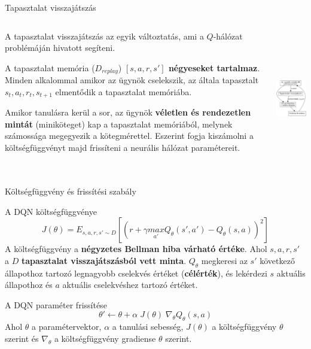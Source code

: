 \documentclass[english, aspectratio=169]{beamer}
\begin{document}
\begin{frame}{Tapasztalat visszajátszás}
\begin{columns}
\begin{column}{.65\textwidth}
A tapasztalat visszajátszás az egyik változtatás, ami a $Q$-hálózat problémáján hivatott segíteni.\par\smallskip
A tapasztalat memória ($D_{replay}$) \textbf{$[s,a,r,s']$ négyeseket tartalmaz}. Minden alkalommal amikor az ügynök cselekszik, az általa tapasztalt $s_t, a_t, r_t, s_{t+1}$ elmentődik a tapasztalat memóriába.\par\smallskip
Amikor tanulásra kerül a sor, az ügynök \textbf{véletlen és rendezetlen mintát} (miniköteget) kap a tapasztalat memóriából, melynek számossága megegyezik a kötegmérettel. Eszerint fogja kiszámolni a költségfüggvényt majd frissíteni a neurális hálózat paramétereit.
\end{column}
\begin{column}{.35\textwidth}
\begin{center}
\includegraphics[height=6cm, keepaspectratio]{graphs/ql_4.png}
\end{center}
\end{column}
\end{columns}
\end{frame}

\begin{frame}{Költségfüggvény és frissítési szabály}
\begin{block}{A DQN költségfüggvénye}
\[
J(\theta) = E_{s,a,r,s' \sim D} \left[ \left( r + \gamma \underset{a'}{max} Q_\theta(s',a') - Q_\theta(s,a) \right)^2 \right]
\]
A költségfüggvény a \textbf{négyzetes Bellman hiba várható értéke}. Ahol $s,a,r,s'$ a $D$ \textbf{tapasztalat visszajátszásból vett minta}. $Q_\theta$ megkeresi az $s'$ következő állapothoz tartozó legnagyobb cselekvés értéket (\textbf{célérték}), és lekérdezi $s$ aktuális állapothoz és $a$ aktuális cselekvéshez tartozó értéket. 
\end{block}
\begin{block}{A DQN paraméter frissítése}
\[
\theta' \leftarrow \theta + \alpha \; J(\theta) \; \nabla_\theta Q_\theta(s,a)
\]
Ahol $\theta$ a paramétervektor, $\alpha$ a tanulási sebesség, $J(\theta)$ a költségfüggvény $\theta$ szerint és $\nabla_\theta$ a költségfüggvény gradiense $\theta$ szerint.
\end{block}
\end{frame}
\end{document}
